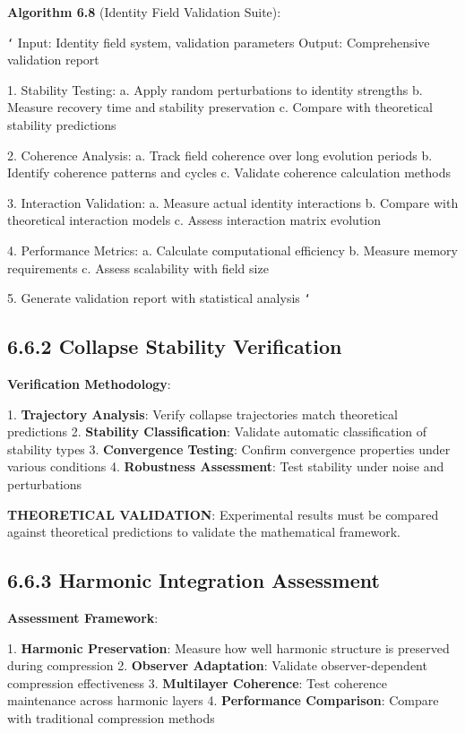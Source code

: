 \textbf{Algorithm 6.8} (Identity Field Validation Suite):

\texttt{`}
Input: Identity field system, validation parameters
Output: Comprehensive validation report

1. Stability Testing:
   a. Apply random perturbations to identity strengths
   b. Measure recovery time and stability preservation
   c. Compare with theoretical stability predictions
   
2. Coherence Analysis:
   a. Track field coherence over long evolution periods
   b. Identify coherence patterns and cycles
   c. Validate coherence calculation methods
   
3. Interaction Validation:
   a. Measure actual identity interactions
   b. Compare with theoretical interaction models
   c. Assess interaction matrix evolution
   
4. Performance Metrics:
   a. Calculate computational efficiency
   b. Measure memory requirements
   c. Assess scalability with field size
   
5. Generate validation report with statistical analysis
\texttt{`}

\subsection{6.6.2 Collapse Stability Verification}

\textbf{Verification Methodology}:

1. \textbf{Trajectory Analysis}: Verify collapse trajectories match theoretical predictions
2. \textbf{Stability Classification}: Validate automatic classification of stability types
3. \textbf{Convergence Testing}: Confirm convergence properties under various conditions
4. \textbf{Robustness Assessment}: Test stability under noise and perturbations

\textbf{THEORETICAL VALIDATION}: Experimental results must be compared against theoretical predictions to validate the mathematical framework.

\subsection{6.6.3 Harmonic Integration Assessment}

\textbf{Assessment Framework}:

1. \textbf{Harmonic Preservation}: Measure how well harmonic structure is preserved during compression
2. \textbf{Observer Adaptation}: Validate observer-dependent compression effectiveness
3. \textbf{Multilayer Coherence}: Test coherence maintenance across harmonic layers
4. \textbf{Performance Comparison}: Compare with traditional compression methods

